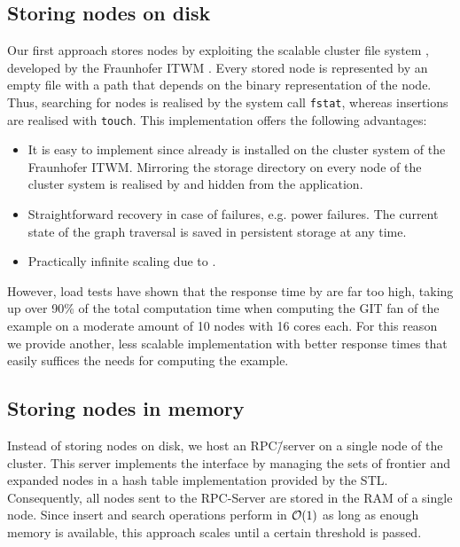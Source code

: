 \subsection{Storing nodes on disk}

Our first approach stores nodes by exploiting the scalable cluster file system \beegfs{}, developed by the \ac{Fraunhofer ITWM} \cite{beegfs}. Every stored node is represented by an empty file with a path that depends on the binary representation of the node. Thus, searching for nodes is realised by the system call \texttt{fstat}, whereas insertions are realised with \texttt{touch}. This implementation offers the following advantages:

\begin{itemize}
	\item It is easy to implement since \beegfs{} already is installed on the cluster system of the \ac{Fraunhofer ITWM}. Mirroring the storage directory on every node of the cluster system is realised by \beegfs{} and hidden from the application.
	\item Straightforward recovery in case of failures, e.g. power failures. The current state of the graph traversal is saved in persistent storage at any time.
	\item Practically infinite scaling due to \beegfs{}.
\end{itemize}

However, load tests have shown that the response time by \beegfs{} are far too high, taking up over 90\% of the total computation time when computing the GIT fan of the \msix{} example on a moderate amount of 10 nodes with 16 cores each. For this reason we provide another, less scalable implementation with better response times that easily suffices the needs for computing the \msix{} example.

\subsection{Storing nodes in memory}

Instead of storing nodes on disk, we host an RPC\=/server on a single node of the cluster. This server implements the interface by managing the sets of frontier and expanded nodes in a hash table implementation provided by the \ac{STL}. Consequently, all nodes sent to the RPC-Server are stored in the RAM of a single node. Since insert and search operations perform in $\mathcal{O}(1)$ as long as enough memory 
is available, this approach scales until a certain threshold is passed.

